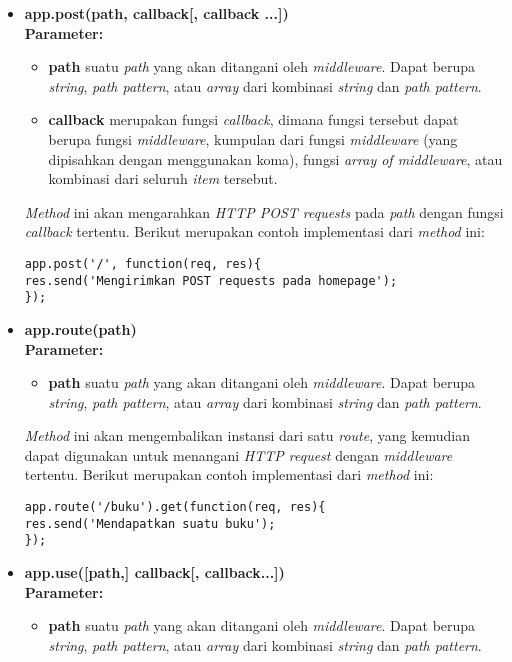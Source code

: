 \begin{itemize}
	\item \textbf{app.post(path, callback[, callback ...])} \\ \textbf{Parameter:}
	\begin{itemize}
		\item \textbf{path} suatu \textit{path} yang akan ditangani oleh \textit{middleware}. Dapat berupa \textit{string}, \textit{path pattern}, atau \textit{array} dari kombinasi \textit{string} dan \textit{path pattern}.
		
		\item \textbf{callback} merupakan fungsi \textit{callback}, dimana fungsi tersebut dapat berupa fungsi \textit{middleware}, kumpulan dari fungsi \textit{middleware} (yang dipisahkan dengan menggunakan koma), fungsi \textit{array of middleware}, atau kombinasi dari seluruh \textit{item} tersebut.
	\end{itemize}
	
	\textit{Method} ini akan mengarahkan \textit{HTTP POST requests} pada \textit{path} dengan fungsi \textit{callback} tertentu. Berikut merupakan contoh implementasi dari \textit{method} ini:
\begin{lstlisting}
app.post('/', function(req, res){
res.send('Mengirimkan POST requests pada homepage');
});
\end{lstlisting}
	
	\item \textbf{app.route(path)} \\ \textbf{Parameter:}
	\begin{itemize}
		\item \textbf{path} suatu \textit{path} yang akan ditangani oleh \textit{middleware}. Dapat berupa \textit{string}, \textit{path pattern}, atau \textit{array} dari kombinasi \textit{string} dan \textit{path pattern}.
	\end{itemize}
	
	\textit{Method} ini akan mengembalikan instansi dari satu \textit{route}, yang kemudian dapat digunakan untuk menangani \textit{HTTP request} dengan \textit{middleware} tertentu. Berikut merupakan contoh implementasi dari \textit{method} ini:
\begin{lstlisting}
app.route('/buku').get(function(req, res){
res.send('Mendapatkan suatu buku');
});
\end{lstlisting}
	
	\item \textbf{app.use([path,] callback[, callback...])} \\ \textbf{Parameter:} 
	\begin{itemize}
		\item \textbf{path} suatu \textit{path} yang akan ditangani oleh \textit{middleware}. Dapat berupa \textit{string}, \textit{path pattern}, atau \textit{array} dari kombinasi \textit{string} dan \textit{path pattern}.
		

\end{itemize}
\end{itemize}
